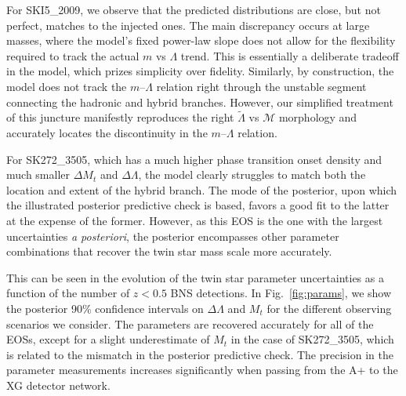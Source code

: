 \documentclass[aps,prl,twocolumn,superscriptaddress,footinbib]{revtex4-1}
\begin{document}
For SKI5\_2009, we observe that the predicted distributions are close, but not perfect, matches to the injected ones. The main discrepancy occurs at large masses, where the model's fixed power-law slope does not allow for the flexibility required to track the actual $m$ vs $\Lambda$ trend. This is essentially a deliberate tradeoff in the model, which prizes simplicity over fidelity. Similarly, by construction, the model does not track the $m$--$\Lambda$ relation right through the unstable segment connecting the hadronic and hybrid branches. However, our simplified treatment of this juncture manifestly reproduces the right $\tilde{\Lambda}$ vs $\mathcal{M}$ morphology and accurately locates the discontinuity in the $m$--$\Lambda$ relation.

For SK272\_3505, which has a much higher phase transition onset density and much smaller $\Delta M_t$ and $\Delta\Lambda$, the model clearly struggles to match both the location and extent of the hybrid branch. The mode of the posterior, upon which the illustrated posterior predictive check is based, favors a good fit to the latter at the expense of the former. However, as this EOS is the one with the largest uncertainties \textit{a posteriori}, the posterior encompasses other parameter combinations that recover the twin star mass scale more accurately.

This can be seen in the evolution of the twin star parameter uncertainties as a function of the number of $z < 0.5$ BNS detections. In Fig.~\ref{fig:params}, we show the posterior 90\% confidence intervals on $\Delta\Lambda$ and $M_t$ for the different observing scenarios we consider. The parameters are recovered accurately for all of the EOSs, except for a slight underestimate of $M_t$ in the case of SK272\_3505, which is related to the mismatch in the posterior predictive check. The precision in the parameter measurements increases significantly when passing from the A+ to the XG detector network.
\end{document}
